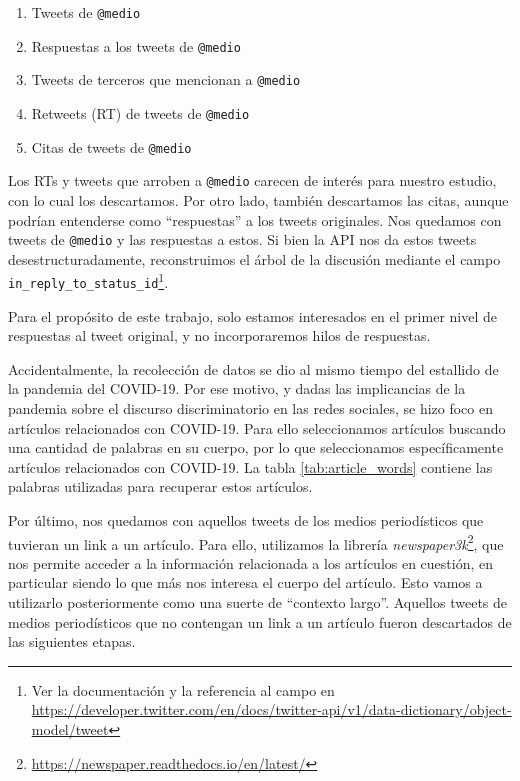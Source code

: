 \begin{enumerate}
    \item Tweets de \verb|@medio|
    \item Respuestas a los tweets de \verb|@medio|
    \item Tweets de terceros que mencionan a \verb|@medio|
    \item Retweets (RT) de tweets de \verb|@medio|
    \item Citas de tweets de \verb|@medio|
\end{enumerate}

Los RTs y tweets que arroben a \verb|@medio| carecen de interés para nuestro estudio, con lo cual los descartamos. Por otro lado, también descartamos las citas, aunque podrían entenderse como ``respuestas'' a los tweets originales. Nos quedamos con tweets de \verb|@medio| y las respuestas a estos. Si bien la API nos da estos tweets desestructuradamente, reconstruimos el árbol de la discusión mediante el campo \verb|in_reply_to_status_id|\footnote{Ver la documentación y la referencia al campo en \url{https://developer.twitter.com/en/docs/twitter-api/v1/data-dictionary/object-model/tweet}}.

Para el propósito de este trabajo, solo estamos interesados en el primer nivel de respuestas al tweet original, y no incorporaremos hilos de respuestas.


Accidentalmente, la recolección de datos se dio al mismo tiempo del estallido de la pandemia del COVID-19. Por ese motivo, y dadas las implicancias de la pandemia sobre el discurso discriminatorio en las redes sociales, se hizo foco en artículos relacionados con COVID-19. Para ello seleccionamos artículos buscando una cantidad de palabras en su cuerpo, por lo que seleccionamos específicamente artículos relacionados con COVID-19. La tabla \ref{tab:article_words} contiene las palabras utilizadas para recuperar estos artículos.

Por último, nos quedamos con aquellos tweets de los medios periodísticos que tuvieran un link a un artículo. Para ello, utilizamos la librería \emph{newspaper3k}\footnote{\url{https://newspaper.readthedocs.io/en/latest/}}, que nos permite acceder a la información relacionada a los artículos en cuestión, en particular siendo lo que más nos interesa el cuerpo del artículo. Esto vamos a utilizarlo posteriormente como una suerte de ``contexto largo''. Aquellos tweets de medios periodísticos que no contengan un link a un artículo fueron descartados de las siguientes etapas.

